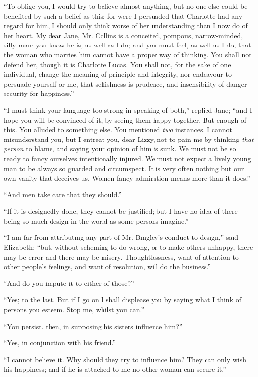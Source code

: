 \documentclass[12pt]{book}
\begin{document}
``To oblige you, I would try to believe almost anything, but no one else could be benefited by such a belief as this; for were I persuaded that Charlotte had any regard for him, I should only think worse of her understanding than I now do of her heart. My dear Jane, Mr. Collins is a conceited, pompous, narrow-minded, silly man: you know he is, as well as I do; and you must feel, as well as I do, that the woman who marries him cannot have a proper way of thinking. You shall not defend her, though it is Charlotte Lucas. You shall not, for the sake of one individual, change the meaning of principle and integrity, nor endeavour to persuade yourself or me, that selfishness is prudence, and insensibility of danger security for happiness.''

``I must think your language too strong in speaking of both,'' replied Jane; ``and I hope you will be convinced of it, by seeing them happy together. But enough of this. You alluded to something else. You mentioned \textit{two} instances. I cannot misunderstand you, but I entreat you, dear Lizzy, not to pain me by thinking \textit{that person} to blame, and saying your opinion of him is sunk. We must not be so ready to fancy ourselves intentionally injured. We must not expect a lively young man to be always so guarded and circumspect. It is very often nothing but our own vanity that deceives us. Women fancy admiration means more than it does.''

``And men take care that they should.''

``If it is designedly done, they cannot be justified; but I have no idea of there being so much design in the world as some persons imagine.''

``I am far from attributing any part of Mr. Bingley's conduct to design,'' said Elizabeth; ``but, without scheming to do wrong, or to make others unhappy, there may be error and there may be misery. Thoughtlessness, want of attention to other people's feelings, and want of resolution, will do the business.''

``And do you impute it to either of those?''

``Yes; to the last. But if I go on I shall displease you by saying what I think of persons you esteem. Stop me, whilst you can.''

``You persist, then, in supposing his sisters influence him?''

``Yes, in conjunction with his friend.''

``I cannot believe it. Why should they try to influence him? They can only wish his happiness; and if he is attached to me no other woman can secure it.''
\end{document}
